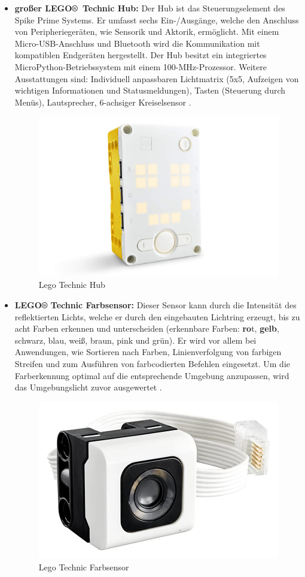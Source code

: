 \begin{itemize}
	\item \textbf{großer LEGO® Technic Hub:}
	Der Hub ist das Steuerungselement des Spike Prime Systems. Er umfasst sechs Ein-/Ausgänge, welche den Anschluss von Peripheriegeräten, wie Sensorik und Aktorik, ermöglicht. Mit einem Micro-USB-Anschluss und Bluetooth wird die Kommunikation mit kompatiblen Endgeräten hergestellt. Der Hub besitzt ein integriertes MicroPython-Betriebssystem mit einem 100-MHz-Prozessor. 
	Weitere Ausstattungen sind:
	Individuell anpassbaren Lichtmatrix (5x5, Aufzeigen von wichtigen Informationen und Statusmeldungen), Tasten (Steuerung durch Menüs), Lautsprecher, 6-achsiger Kreiselsensor \autocites{lego_spike_prime_2023}.
	
	\begin{figure}[H]
		\centering
		\includegraphics[width=0.5\linewidth]{images/Hub}
		\caption{Lego Technic Hub}
		\label{fig:hub}
	\end{figure}
	
	
	\item \textbf{LEGO® Technic Farbsensor:}
	Dieser Sensor kann durch die Intensität des reflektierten Lichts, welche er durch den eingebauten Lichtring erzeugt, bis zu acht Farben erkennen und unterscheiden (erkennbare Farben: \textbf{ro}t,  \textbf{gelb}, schwarz, blau, weiß, braun,  pink und grün). Er wird vor allem bei Anwendungen, wie Sortieren nach Farben, Linienverfolgung von farbigen Streifen und zum Ausführen von farbcodierten Befehlen eingesetzt. Um die Farberkennung optimal auf die entsprechende Umgebung anzupassen, wird das Umgebungslicht zuvor ausgewertet \autocites{lego_spike_prime_2023}.
	
	\begin{figure}[H]
		\centering
		\includegraphics[width=0.5\linewidth]{images/Farbsensor}
		\caption{Lego Technic Farbsensor}
		\label{fig:farbsensor}
	\end{figure}
	

\end{itemize}
